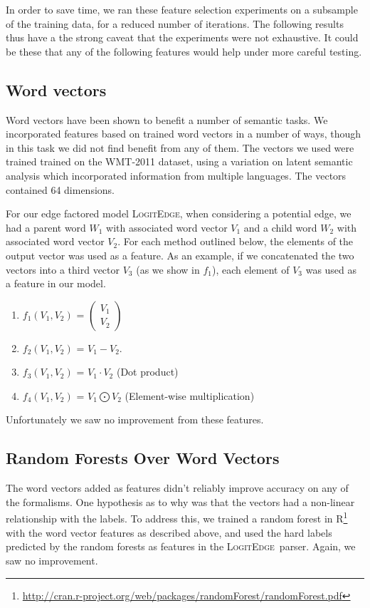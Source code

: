 \documentclass[11pt]{article}
\newcommand{\logitedge}{\textsc{LogitEdge}}
\begin{document}
In order to save time, we ran these feature selection experiments
on a subsample of the training data, for a reduced number of iterations.
The following results thus have a 
the strong caveat that the experiments were
not exhaustive.  It could be these that any of the following features would help under more careful testing.

\subsection{Word vectors}
Word vectors have been shown to benefit a number of semantic tasks. We
incorporated features based on trained word vectors in a number of ways, though
in this task we did not find benefit from any of them.
The vectors we used \cite{wordVectors} were trained trained on the WMT-2011
dataset, using a variation on latent semantic analysis which incorporated
information from multiple languages.
The vectors contained 64 dimensions.

For our edge factored model \logitedge, when considering a potential edge, we
had a parent word $W_1$ with associated word vector $V_1$ and a child word
$W_2$ with associated word vector $V_2$.
For each method outlined below, the elements of the output vector was used as a
feature.
As an example, if we concatenated the two vectors into a third vector $V_3$ (as
we show in $f_1$), each element of $V_3$ was used as a feature in our model.

\begin{enumerate}
\item $f_1(V_1,V_2)$ = $ \left( \begin{smallmatrix} V_1\\ V_2 \end{smallmatrix} \right)$
\item $f_2(V_1,V_2)$ = $V_1 - V_2$.
\item $f_3(V_1,V_2)$ = $V_1 \cdot V_2$ (Dot product)
\item $f_4(V_1,V_2)$ = $V_1 \bigodot V_2$ (Element-wise multiplication)
\end{enumerate}
Unfortunately we saw no improvement from these features.

\subsection{Random Forests Over Word Vectors}
The word vectors added as features didn't reliably improve accuracy on any of
the formalisms.
One hypothesis as to why was that the vectors had a non-linear relationship
with the labels.
To address this, we trained a random forest in
R\footnote{\url{http://cran.r-project.org/web/packages/randomForest/randomForest.pdf}}
with the word vector features as described above, and used the hard labels
predicted by the random forests as features in the \logitedge\ parser.
Again, we saw no improvement.
\end{document}
